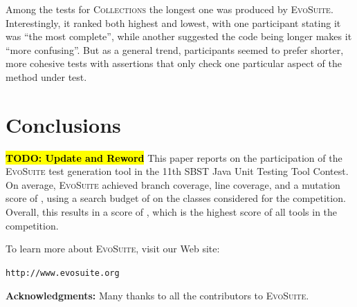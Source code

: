 \documentclass[10pt,conference]{IEEEtran}
\newcommand{\TODO}[1]{\sethlcolor{yellow}\textbf{\textcolor{ScarletRed}{\hl{TODO: #1}}}\xspace}
\newcommand{\TODO}[1]{}
\newcommand{\project}[1]{\textsc{#1}\xspace}
\newcommand{\Collections}{\project{Collections}}
\newcommand{\EVOSUITE}{\textsc{EvoSuite}\xspace}
\begin{document}
Among the tests for \Collections the longest one was produced by \EVOSUITE.
Interestingly, it ranked both highest and lowest, with one participant
stating it was ``the most complete'', while another suggested the code
being longer makes it ``more confusing''. But as a general trend, participants
seemed to prefer shorter, more cohesive tests with assertions that only check
one particular aspect of the method under test.

\section{Conclusions}

\TODO{Update and Reword}
This paper reports on the participation of the \EVOSUITE test generation tool
in the 11th SBST Java Unit Testing Tool Contest. On average, \EVOSUITE
achieved \avgConditionsCoverageRatioLong branch coverage,
\avgLinesCoverageRatioLong line coverage, and a mutation score of
\avgMutantsCoverageRatioLong, using a search budget of \budgetLong on the \cuts
classes considered for the competition. Overall, this results in a score of
\score, which is the highest score of all tools in the competition.


To learn more about \EVOSUITE, visit our Web site:
\begin{center}
\texttt{http://www.evosuite.org}
\end{center}



\textbf{Acknowledgments:} Many thanks to all the contributors to
\EVOSUITE.




\balance
\end{document}
